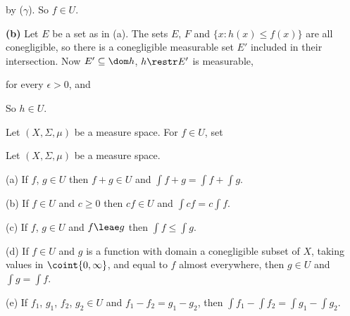 {\noindent by ($\gamma$).   So $f\in U$.

\medskip

{\bf (b)} Let $E$ be a set as in (a).   The sets $E$, $F$ and
$\{x:h(x)\le f(x)\}$ are all conegligible, so there is a conegligible
measurable set $E'$ included in their intersection.   Now
$E'\subseteq\dom h$, $h\restr E'$ is measurable,


\noindent for
every $\epsilon>0$, and


\noindent So $h\in U$.
}%

 Let $(X,\Sigma,\mu)$ be a measure
space.   For $f\in U$, set





 Let $(X,\Sigma,\mu)$ be a measure space.

(a) If $f$, $g\in U$ then $f+g\in U$ and $\int f+g=\int f+\int g$.

(b) If $f\in U$ and $c\ge 0$ then $cf\in U$ and $\int cf=c\int f$.

(c) If $f$, $g\in U$ and $f\leae g$ then $\int f\le \int g$.

(d) If $f\in U$ and $g$ is a function with domain a conegligible
subset
of $X$, taking values in $\coint{0,\infty}$, and equal to $f$ almost
everywhere, then $g\in U$ and $\int g=\int f$.

(e) If $f_1$, $g_1$, $f_2$, $g_2\in U$ and $f_1-f_2=g_1-g_2$, then
$\int
f_1-\int f_2=\int g_1-\int g_2$.

